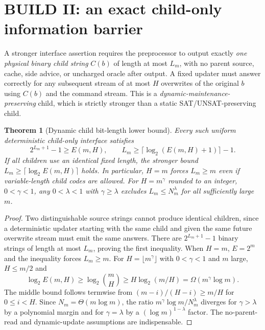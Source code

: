 \documentclass[11pt]{article}
\newtheorem{theorem}{Theorem}
\begin{document}
\section{BUILD II: an exact child-only information barrier}
A stronger interface assertion requires the preprocessor to output exactly \emph{one physical binary child string} $C(b)$ of length at most $L_m$, with no parent source, cache, side advice, or uncharged oracle after output. A fixed updater must answer correctly for any subsequent stream of at most $H$ overwrites of the original $b$ using $C(b)$ and the command stream. This is a \emph{dynamic-maintenance-preserving} child, which is strictly stronger than a static SAT/UNSAT-preserving child.

\begin{theorem}[Dynamic child bit-length lower bound]\label{thm:child}
Every such uniform deterministic child-only interface satisfies
\[
\boxed{2^{L_m+1}-1\ge E(m,H),\qquad L_m\ge\lceil\log_2(E(m,H)+1)\rceil-1.}
\]
If all children use an identical fixed length, the stronger bound $L_m\ge\lceil\log_2E(m,H)\rceil$ holds. In particular, $H=m$ forces $L_m\ge m$ even if variable-length child codes are allowed. For $H=m^\gamma$ rounded to an integer, $0<\gamma<1$, any $0<\lambda<1$ with $\gamma\ge\lambda$ excludes $L_m\le N_m^\lambda$ for all sufficiently large $m$.
\end{theorem}
\begin{proof}
Two distinguishable source strings cannot produce identical children, since a deterministic updater starting with the same child and given the same future overwrite stream must emit the same answers. There are $2^{L_m+1}-1$ binary strings of length at most $L_m$, proving the first inequality. When $H=m$, $E=2^m$ and the inequality forces $L_m\ge m$. For $H=\lfloor m^\gamma\rfloor$ with $0<\gamma<1$ and $m$ large, $H\le m/2$ and
\[
\log_2E(m,H)\ge\log_2\binom mH
\ge H\log_2(m/H)=\Omega(m^\gamma\log m).
\]
The middle bound follows termwise from $(m-i)/(H-i)\ge m/H$ for $0\le i<H$. Since $N_m=\Theta(m\log m)$, the ratio $m^\gamma\log m/N_m^\lambda$ diverges for $\gamma>\lambda$ by a polynomial margin and for $\gamma=\lambda$ by a $(\log m)^{1-\lambda}$ factor. The no-parent-read and dynamic-update assumptions are indispensable.
\end{proof}
\end{document}
